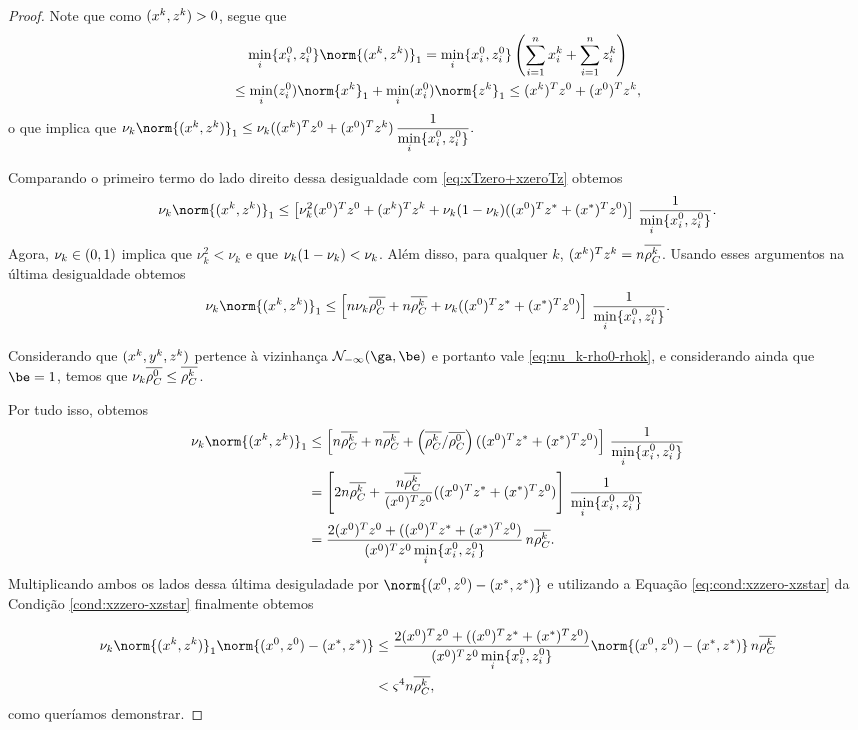 \begin{proof}
Note que como  $(x^{k},z^{k})>0$, segue que 
\begin{multline*}
		\minxzinit\norm{(\xk,\zk)}_{1} = \minxzinit\left(\sum_{i=1}^{n}\xk_{i} + \sum_{i=1}^{n}\zk_{i} \right) \\ 
	 \leq \min_{i}(\zzero_{i})\norm{\xk}_{1} + \min_{i}(\xzero_{i})\norm{\zk}_{1}\leq
(\xk)^{T}\zzero + (\xzero)^{T}\zk,
\end{multline*}
o que implica que $
	\nuk \norm{(\xk,\zk)}_{1} \leq  \nuk ((\xk)^{T}\zzero + (\xzero)^{T}\zk)  \, \dfrac{1}{\minxzinit}.$

 Comparando o primeiro termo do lado direito dessa desigualdade com  \eqref{eq:xTzero+xzeroTz} obtemos 
\[
	\nuk \norm{(\xk,\zk)}_{1}  \leq\left[ \nuk ^{2}(\xzero)^T\zzero  + (\xk)^{T}\zk+  \nuk (1-\nuk )((\xzero)^{T}\zstar + (\xstar)^{T}\zzero)\right] \, \dfrac{1}{\minxzinit}. 
\]
Agora,   $\nu_{k} \in(0,1)$ implica que $\nu_{k}^{2}< \nu_{k}$ e que $\nu_{k} (1-\nu_{k} ) < \nu_{k} $. Além disso, para qualquer $k$, $(x^{k})^{T}z^{k} = n\overline{\rho_C^{k}} $.  Usando esses argumentos na última desigualdade obtemos
\[
	\nuk \norm{(\xk,\zk)}_{1} 	\leq \left[ n \nuk  \dbvec{\rho_C^0} + n\rhoCkb  + \nuk ((\xzero)^{T}\zstar + (\xstar)^{T}\zzero)\right] \, \dfrac{1}{\minxzinit}.  
\]

Considerando que $(x^{k},y^{k},z^{k})$ pertence à vizinhança $\Nset_{-\infty}(\ga,\be)$ e portanto vale  \eqref{eq:nu_k-rho0-rhok},  e considerando ainda que  $\be=1$, temos que $\nu_{k}  \overline{\rho_C^0} \leq  \overline{\rho_C^{k}} $.  


Por tudo isso,  obtemos 
\[
	\begin{aligned}
		\nuk \norm{(\xk,\zk)}_{1}  & 	\leq \left[ n\rhoCkb  + n\rhoCkb  + \left(\rhoCkb /\dbvec{\rho_C^{0}}\right)((\xzero)^{T}\zstar + (\xstar)^{T}\zzero)\right] \, \dfrac{1}{\minxzinit} \\ 
								& =  \left[ 2n\rhoCkb  +\frac{n\rhoCkb }{(\xzero)^{T}\zzero}((\xzero)^{T}\zstar + (\xstar)^{T}\zzero)\right] \, \dfrac{1}{\minxzinit} \\ 
								& = \dfrac{ 2(\xzero)^{T}\zzero  + ((\xzero)^{T}\zstar + (\xstar)^{T}\zzero)} {(\xzero)^{T}\zzero \minxzinit} \, n\rhoCkb .
		\end{aligned}
\]
 Multiplicando  ambos os lados  dessa última desiguladade por $ \norm{(\xzero,\zzero) - (\xstar,\zstar)}$ e utilizando a Equação \eqref{eq:cond:xzzero-xzstar} da Condição \ref{cond:xzzero-xzstar} finalmente obtemos

\[
	\begin{aligned}
		\nuk \norm{(\xk,\zk)}_{1}\norm{(\xzero,\zzero) - (\xstar,\zstar)}  & \leq \dfrac{ 2(\xzero)^{T}\zzero  + ((\xzero)^{T}\zstar + (\xstar)^{T}\zzero)} {(\xzero)^{T}\zzero \minxzinit} \norm{(\xzero,\zzero) - (\xstar,\zstar)} \, n\rhoCkb  \\
					& < \bdxzstar^{4}n\rhoCkb ,
		\end{aligned}
\]
como queríamos demonstrar.
\end{proof}



